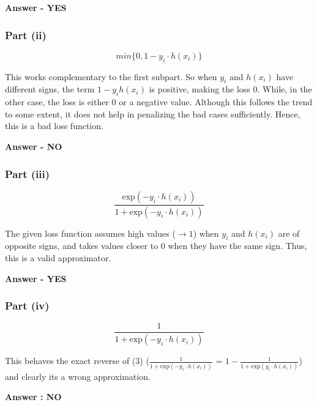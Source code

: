 \documentclass[12pt]{article}
\begin{document}
\vspace{2pt}

\textbf{Answer - YES}

\subsubsection{Part (ii)}

\[min\{0, 1 - y_i\cdot h(x_i)\}\]

\vspace{4pt}

This works complementary to the first subpart. So when $y_i$ and $h(x_i)$ have different signs, the term $1-y_ih(x_i)$ is positive, making the loss $0$. While, in the other case, the loss is either $0$ or a negative value. Although this follows the trend to some extent, it does not help in penalizing the bad cases sufficiently. Hence, this is a bad loss function.

\vspace{2pt}

\textbf{Answer - NO}


\subsubsection{Part (iii)}

\[\frac{\text{exp}(-y_i\cdot h(x_i))}{1 + \text{exp}(-y_i\cdot h(x_i))}\]


The given loss function assumes high values ($ \to 1$) when $y_i$ and $h(x_i)$ are of opposite signs, and takes values closer to $0$ when they have the same sign. Thus, this is a valid approximator.

\vspace{2pt}

\textbf{Answer - YES}


\subsubsection{Part (iv)}

 \[\frac{1}{1 + \text{exp}(-y_i\cdot h(x_i))}\]
 
 
       
        This behaves the exact reverse of (3) ($\frac{1}{1 + \text{exp}(-y_i\cdot h(x_i))}$ = $1 - \frac{1}{1 + \text{exp}(y_i\cdot h(x_i))}$) and clearly its a wrong approximation.


\vspace{2pt}

 \textbf{Answer : NO}
\end{document}
